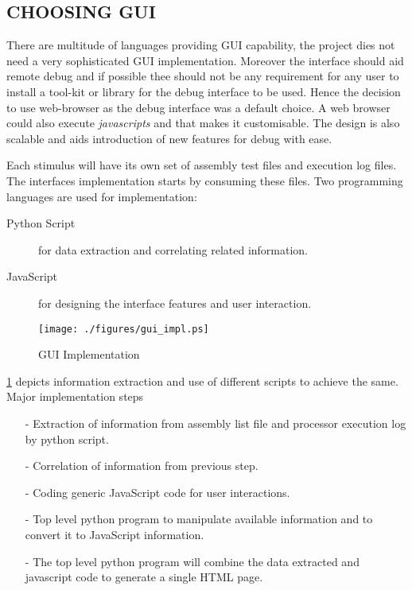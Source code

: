 
\subsection {CHOOSING GUI}
There are multitude of languages providing GUI capability, the project dies not need a very sophisticated GUI implementation. Moreover the interface should aid remote debug and if possible thee should not be any requirement for any user to install a tool-kit or library for the debug interface to be used. Hence the decision to use web-browser as the debug interface was a default choice. A web browser could also execute {\it javascripts} and that makes it customisable. The design is also scalable and aids introduction of new features for debug with ease.

Each stimulus will have its own set of assembly test files and execution log files. The interfaces implementation starts by consuming these files. Two programming languages are used for implementation:
\begin{description}
\item[Python Script] for data extraction and correlating related information.
\item[JavaScript] for designing the interface features and user interaction.
\end{description}

\begin{figure}[h]
\centering
\texttt{[image: ./figures/gui\_impl.ps]}
\caption{GUI Implementation} 
\label{fig:gui_impl.eps}
\end{figure}

\figurename{\ref{fig:gui_impl.eps}} depicts information extraction and use of different scripts to achieve the same. Major implementation steps
\begin{itemize}
\item[-] Extraction of information from assembly list file and processor execution log by python script.
\item[-] Correlation of information from previous step.
\item[-] Coding generic JavaScript code for user interactions.
\item[-] Top level python program to manipulate available information and to convert it to JavaScript information. 
\item[-] The top level python program will combine the data extracted and javascript code to generate a single HTML page. 
\end{itemize}

